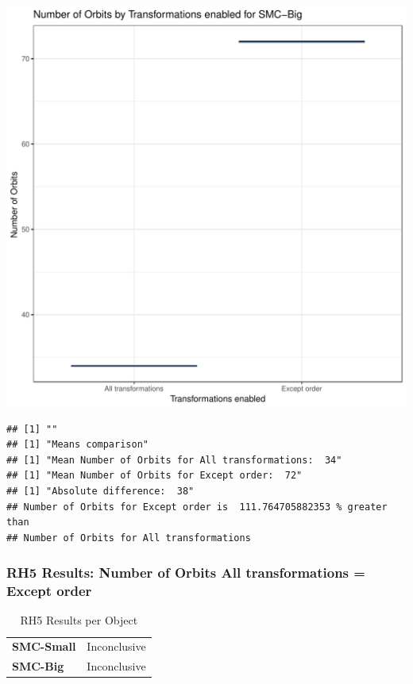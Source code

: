 \documentclass{article}\usepackage[]{graphicx}\usepackage[]{color}
\makeatletter
\def\maxwidth{ %
  \ifdim\Gin@nat@width>\linewidth
    \linewidth
  \else
    \Gin@nat@width
  \fi
}
\newenvironment{kframe}{%
 \def\at@end@of@kframe{}%
 \ifinner\ifhmode%
  \def\at@end@of@kframe{\end{minipage}}%
  \begin{minipage}{\columnwidth}%
 \fi\fi%
 \def\FrameCommand##1{\hskip\@totalleftmargin \hskip-\fboxsep
 \colorbox{shadecolor}{##1}\hskip-\fboxsep
     \hskip-\linewidth \hskip-\@totalleftmargin \hskip\columnwidth}%
 \MakeFramed {\advance\hsize-\width
   \@totalleftmargin\z@ \linewidth\hsize
   \@setminipage}}%
 {\par\unskip\endMakeFramed%
 \at@end@of@kframe}
\newenvironment{knitrout}{}{} %
\makeatother
\begin{document}
\begin{knitrout}
\color{fgcolor}
\includegraphics[width=\maxwidth]{figure/RH5_big-1} 
\begin{kframe}

{\ttfamily\noindent\bfseries\color{errorcolor}{\#\# Error in eval(expr, envir, enclos): object 'shap\_cashew\_big' not found}}\begin{verbatim}
## [1] ""
## [1] "Means comparison"
## [1] "Mean Number of Orbits for All transformations:  34"
## [1] "Mean Number of Orbits for Except order:  72"
## [1] "Absolute difference:  38"
## Number of Orbits for Except order is  111.764705882353 % greater than 
## Number of Orbits for All transformations
\end{verbatim}
\end{kframe}
\end{knitrout}


 

	
	\subsubsection{RH5 Results: Number of Orbits All transformations = Except order}
	
	
	\begin{table}[H]
	\centering
	\caption{RH5 Results per Object}
	\begin{tabular}{ll}
	\textbf{SMC-Small} & Inconclusive \\
	\textbf{SMC-Big} & Inconclusive \\
	\end{tabular}
	\end{table}
\end{document}
